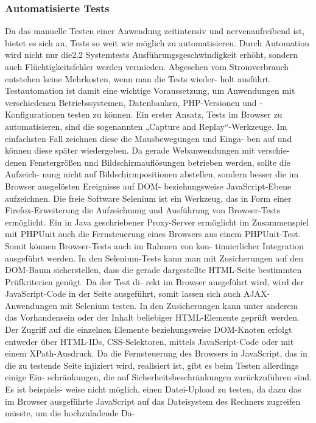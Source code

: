 \subsubsection{Automatisierte Tests}
Da das manuelle Testen einer Anwendung zeitintensiv und nervenaufreibend ist, bietet es
sich an, Tests so weit wie möglich zu automatisieren. Durch Automation wird nicht nur die2.2 Systemtests
Ausführungsgeschwindigkeit erhöht, sondern auch Flüchtigkeitsfehler werden vermieden.
Abgesehen vom Stromverbrauch entstehen keine Mehrkosten, wenn man die Tests wieder-
holt ausführt. Testautomation ist damit eine wichtige Voraussetzung, um Anwendungen
mit verschiedenen Betriebssystemen, Datenbanken, PHP-Versionen und -Konfigurationen
testen zu können.
Ein erster Ansatz, Tests im Browser zu automatisieren, sind die sogenannten „Capture and
Replay“-Werkzeuge. Im einfachsten Fall zeichnen diese die Mausbewegungen und Einga-
ben auf und können diese später wiedergeben. Da gerade Webanwendungen mit verschie-
denen Fenstergrößen und Bildschirmauflösungen betrieben werden, sollte die Aufzeich-
nung nicht auf Bildschirmpositionen abstellen, sondern besser die im Browser ausgelösten
Ereignisse auf DOM- beziehungsweise JavaScript-Ebene aufzeichnen.
Die freie Software Selenium ist ein Werkzeug, das in Form einer Firefox-Erweiterung die
Aufzeichnung und Ausführung von Browser-Tests ermöglicht. Ein in Java geschriebener
Proxy-Server ermöglicht im Zusammenspiel mit PHPUnit auch die Fernsteuerung eines
Browsers aus einem PHPUnit-Test. Somit können Browser-Tests auch im Rahmen von kon-
tinuierlicher Integration ausgeführt werden.
In den Selenium-Tests kann man mit Zusicherungen auf den DOM-Baum sicherstellen,
dass die gerade dargestellte HTML-Seite bestimmten Prüfkriterien genügt. Da der Test di-
rekt im Browser ausgeführt wird, wird der JavaScript-Code in der Seite ausgeführt, somit
lassen sich auch AJAX-Anwendungen mit Selenium testen.
In den Zusicherungen kann unter anderem das Vorhandensein oder der Inhalt beliebiger
HTML-Elemente geprüft werden. Der Zugriff auf die einzelnen Elemente beziehungsweise
DOM-Knoten erfolgt entweder über HTML-IDs, CSS-Selektoren, mittels JavaScript-Code
oder mit einem XPath-Ausdruck. Da die Fernsteuerung des Browsers in JavaScript, das in
die zu testende Seite injiziert wird, realisiert ist, gibt es beim Testen allerdings einige Ein-
schränkungen, die auf Sicherheitsbeschränkungen zurückzuführen sind. Es ist beispiels-
weise nicht möglich, einen Datei-Upload zu testen, da dazu das im Browser ausgeführte
JavaScript auf das Dateisystem des Rechners zugreifen müsste, um die hochzuladende Da-
